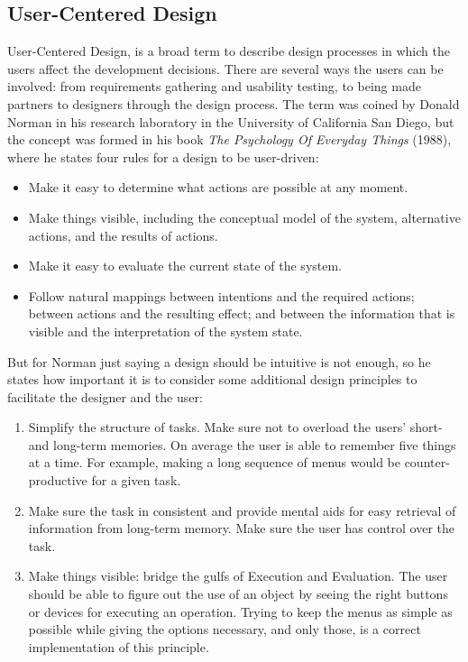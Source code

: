 \subsection{User-Centered Design}
\par User-Centered Design, is a broad term to describe design processes in which the users affect the development decisions. There are several ways the users can be involved: from requirements gathering and usability testing, to being made partners to designers through the design process.\cite{Abras04user-centereddesign} The term was coined by Donald Norman in his research laboratory in the University of California San Diego, but the concept was formed in his book \textit{The Psychology Of Everyday Things} (1988), where he states four rules for a design to be user-driven:
\begin{itemize}
    \item Make it easy to determine what actions are possible at any moment.
    \item Make things visible, including the conceptual model of the system, alternative actions, and the results of actions. 
    \item Make it easy to evaluate the current state of the system.
    \item Follow natural mappings between intentions and the required actions; between actions and the resulting effect; and between the information that is visible and the interpretation of the system state.
\end{itemize}
\par But for Norman just saying a design should be intuitive is not enough, so he states how important it is to consider some additional design principles to facilitate the designer and the user:
\begin{enumerate}
    \item Simplify the structure of tasks. Make sure not to overload the users' short- and long-term memories. On average the user is able to remember five things at a time. For example, making a long sequence of menus would be counter-productive for a given task. 
    \item Make sure the task in consistent and provide mental aids for easy retrieval of information from long-term memory. Make sure the user has control over the task. 
    \item Make things visible: bridge the gulfs of Execution and Evaluation. The user should be able to figure out the use of an object by seeing the right buttons or devices for executing an operation. Trying to keep the menus as simple as possible while giving the options necessary, and only those, is a correct implementation of this principle.
\end{enumerate} 


